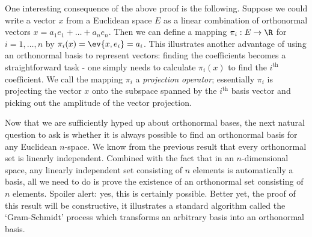 One interesting consequence of the above proof is the following. Suppose we could write a vector \( x \) from a Euclidean space \( E \) as a linear combination of orthonormal vectors \( x=a_1e_1+\dots+a_ne_n \). Then we can define a mapping \( \pi_i:E\to\R \) for \( i=1,\dots, n \) by \( \pi_i(x)=\ev{x,e_i}=a_i \). This illustrates another advantage of using an orthonormal basis to represent vectors: finding the coefficients becomes a straightforward task - one simply needs to calculate \( \pi_i(x) \) to find the \( i^{\text{th}} \) coefficient. We call the mapping \( \pi_i \) a \emph{projection operator}; essentially \( \pi_i \) is projecting the vector \( x \) onto the subspace spanned by the \( i^{\text{th}} \) basis vector and picking out the amplitude of the vector projection.

\vspace{3mm}

Now that we are sufficiently hyped up about orthonormal bases, the next natural question to ask is whether it is always possible to find an orthonormal basis for any Euclidean \( n \)-space. We know from the previous result that every orthonormal set is linearly independent. Combined with the fact that in an \( n \)-dimensional space, any linearly independent set consisting of \( n \) elements is automatically a basis, all we need to do is prove the existence of an orthonormal set consisting of \( n \) elements. Spoiler alert: yes, this is certainly possible. Better yet, the proof of this result will be constructive, it illustrates a standard algorithm called the `Gram-Schmidt' process which transforms an arbitrary basis into an orthonormal basis.

